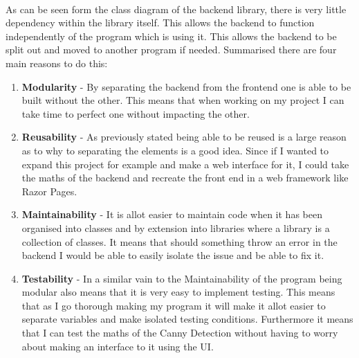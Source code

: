 \begin{flushleft}
    \begin{figure}[H]
        \centering
    \end{figure}

    \\

    As can be seen form the class diagram of the backend library, there is very little dependency within the library itself. This allows the backend to function independently of the program which is using it. This allows the backend to be split out and moved to another program if needed. Summarised there are four main reasons to do this:

    \begin{enumerate}
        \item \textbf{Modularity} - By separating the backend from the frontend one is able to be built without the other. This means that when working on my project I can take time to perfect one without impacting the other.
        \item \textbf{Reusability} - As previously stated being able to be reused is a large reason as to why to separating the elements is a good idea. Since if I wanted to expand this project for example and make a web interface for it, I could take the maths of the backend and recreate the front end in a web framework like Razor Pages.
        \item \textbf{Maintainability} - It is allot easier to maintain code when it has been organised into classes and by extension into libraries where a library is a collection of classes. It means that should something throw an error in the backend I would be able to easily isolate the issue and be able to fix it.
        \item \textbf{Testability} - In a similar vain to the Maintainability of the program being modular also means that it is very easy to implement testing. This means that as I go thorough making my program it will make it allot easier to separate variables and make isolated testing conditions. Furthermore it means that I can test the maths of the Canny Detection without having to worry about making an interface to it using the UI.
    \\ \BK


\end{enumerate}
\end{flushleft}
